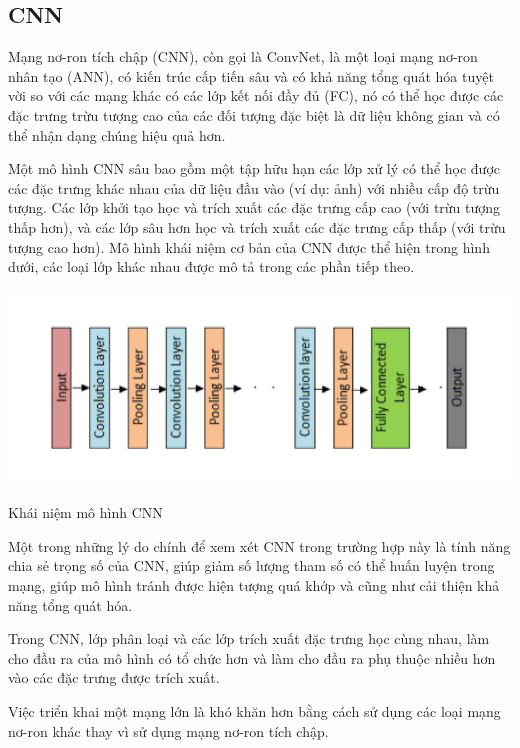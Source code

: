 \subsection{CNN}

Mạng nơ-ron tích chập (CNN), còn gọi là ConvNet, là một loại mạng nơ-ron nhân tạo (ANN), có kiến trúc cấp tiến sâu và có khả năng tổng quát hóa tuyệt vời so với các mạng khác có các lớp kết nối đầy đủ (FC), nó có thể học được các đặc trưng trừu tượng cao của các đối tượng đặc biệt là dữ liệu không gian và có thể nhận dạng chúng hiệu quả hơn.

Một mô hình CNN sâu bao gồm một tập hữu hạn các lớp xử lý có thể học được các đặc trưng khác nhau của dữ liệu đầu vào (ví dụ: ảnh) với nhiều cấp độ trừu tượng. Các lớp khởi tạo học và trích xuất các đặc trưng cấp cao (với trừu tượng thấp hơn), và các lớp sâu hơn học và trích xuất các đặc trưng cấp thấp (với trừu tượng cao hơn). Mô hình khái niệm cơ bản của CNN được thể hiện trong hình dưới, các loại lớp khác nhau được mô tả trong các phần tiếp theo\cite{cnn}.

\begin{minipage}{\linewidth}
    \captionsetup{type=figure}
    \centering
    \includegraphics[width=1\textwidth]{images/concept_cnn.png}
    \caption{Khái niệm mô hình CNN}
    \label{fig:enter-label}
\end{minipage}

Một trong những lý do chính để xem xét CNN trong trường hợp này là tính năng chia sẻ trọng số của CNN, giúp giảm số lượng tham số có thể huấn luyện trong mạng, giúp mô hình tránh được hiện tượng quá khớp và cũng như cải thiện khả năng tổng quát hóa.

Trong CNN, lớp phân loại và các lớp trích xuất đặc trưng học cùng nhau, làm cho đầu ra của mô hình có tổ chức hơn và làm cho đầu ra phụ thuộc nhiều hơn vào các đặc trưng được trích xuất.

Việc triển khai một mạng lớn là khó khăn hơn bằng cách sử dụng các loại mạng nơ-ron khác thay vì sử dụng mạng nơ-ron tích chập. 

